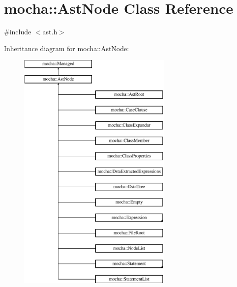 \hypertarget{classmocha_1_1_ast_node}{
\section{mocha::AstNode Class Reference}
\label{classmocha_1_1_ast_node}
}


{\ttfamily \#include $<$ast.h$>$}

Inheritance diagram for mocha::AstNode:\begin{figure}[H]
\begin{center}
\leavevmode
\includegraphics[height=12.000000cm]{classmocha_1_1_ast_node}
\end{center}
\end{figure}
